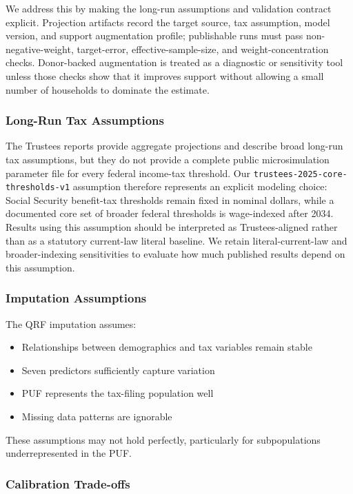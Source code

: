 We address this by making the long-run assumptions and validation contract explicit. Projection artifacts record the target source, tax assumption, model version, and support augmentation profile; publishable runs must pass non-negative-weight, target-error, effective-sample-size, and weight-concentration checks. Donor-backed augmentation is treated as a diagnostic or sensitivity tool unless those checks show that it improves support without allowing a small number of households to dominate the estimate.

\subsubsection{Long-Run Tax Assumptions}

The Trustees reports provide aggregate projections and describe broad long-run tax assumptions, but they do not provide a complete public microsimulation parameter file for every federal income-tax threshold. Our \texttt{trustees-2025-core-thresholds-v1} assumption therefore represents an explicit modeling choice: Social Security benefit-tax thresholds remain fixed in nominal dollars, while a documented core set of broader federal thresholds is wage-indexed after 2034. Results using this assumption should be interpreted as Trustees-aligned rather than as a statutory current-law literal baseline. We retain literal-current-law and broader-indexing sensitivities to evaluate how much published results depend on this assumption.

\subsubsection{Imputation Assumptions}

The QRF imputation assumes:
\begin{itemize}
\item Relationships between demographics and tax variables remain stable
\item Seven predictors sufficiently capture variation
\item PUF represents the tax-filing population well
\item Missing data patterns are ignorable
\end{itemize}

These assumptions may not hold perfectly, particularly for subpopulations underrepresented in the PUF.

\subsubsection{Calibration Trade-offs}

